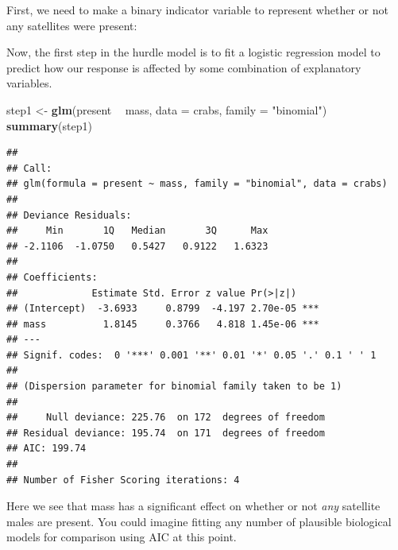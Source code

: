 \documentclass[
]{book}
\newenvironment{Shaded}{\begin{snugshade}}{\end{snugshade}}
\newcommand{\CommentTok}[1]{\textcolor[rgb]{0.56,0.35,0.01}{\textit{#1}}}
\newcommand{\DataTypeTok}[1]{\textcolor[rgb]{0.13,0.29,0.53}{#1}}
\newcommand{\DecValTok}[1]{\textcolor[rgb]{0.00,0.00,0.81}{#1}}
\newcommand{\KeywordTok}[1]{\textcolor[rgb]{0.13,0.29,0.53}{\textbf{#1}}}
\newcommand{\NormalTok}[1]{#1}
\newcommand{\OperatorTok}[1]{\textcolor[rgb]{0.81,0.36,0.00}{\textbf{#1}}}
\newcommand{\StringTok}[1]{\textcolor[rgb]{0.31,0.60,0.02}{#1}}
\begin{document}
First, we need to make a binary indicator variable to represent whether or not any satellites were present:

\begin{Shaded}
\end{Shaded}

Now, the first step in the hurdle model is to fit a logistic regression model to predict how our response is affected by some combination of explanatory variables.

\begin{Shaded}
\begin{Highlighting}[]
\NormalTok{step1 <-}\StringTok{ }\KeywordTok{glm}\NormalTok{(present }\OperatorTok{~}\StringTok{ }\NormalTok{mass, }\DataTypeTok{data =}\NormalTok{ crabs, }\DataTypeTok{family =} \StringTok{"binomial"}\NormalTok{)}
\KeywordTok{summary}\NormalTok{(step1)}
\end{Highlighting}
\end{Shaded}

\begin{verbatim}
## 
## Call:
## glm(formula = present ~ mass, family = "binomial", data = crabs)
## 
## Deviance Residuals: 
##     Min       1Q   Median       3Q      Max  
## -2.1106  -1.0750   0.5427   0.9122   1.6323  
## 
## Coefficients:
##             Estimate Std. Error z value Pr(>|z|)    
## (Intercept)  -3.6933     0.8799  -4.197 2.70e-05 ***
## mass          1.8145     0.3766   4.818 1.45e-06 ***
## ---
## Signif. codes:  0 '***' 0.001 '**' 0.01 '*' 0.05 '.' 0.1 ' ' 1
## 
## (Dispersion parameter for binomial family taken to be 1)
## 
##     Null deviance: 225.76  on 172  degrees of freedom
## Residual deviance: 195.74  on 171  degrees of freedom
## AIC: 199.74
## 
## Number of Fisher Scoring iterations: 4
\end{verbatim}

Here we see that mass has a significant effect on whether or not \emph{any} satellite males are present. You could imagine fitting any number of plausible biological models for comparison using AIC at this point.
\end{document}
